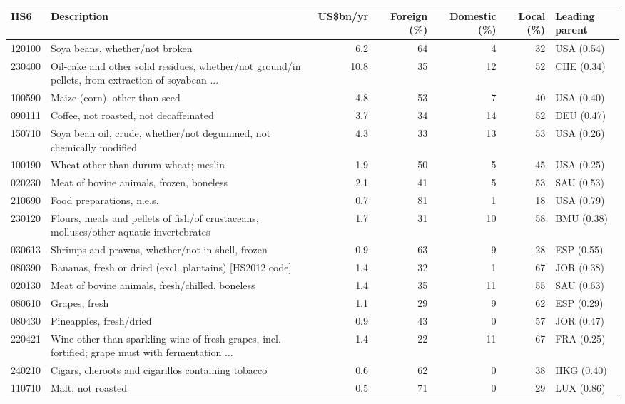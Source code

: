 \begin{tabular}{@{}l p{6.4cm} r r r r l@{}}
\toprule
HS6 & Description & US\$bn/yr & Foreign (\%) & Domestic (\%) & Local (\%) & Leading parent \\
\midrule
120100 & Soya beans, whether/\allowbreak{}not broken & 6.2 & 64 & 4 & 32 & USA (0.54) \\
230400 & Oil-cake and other solid residues, whether/\allowbreak{}not ground/\allowbreak{}in pellets, from extraction of soyabean ... & 10.8 & 35 & 12 & 52 & CHE (0.34) \\
100590 & Maize (corn), other than seed & 4.8 & 53 & 7 & 40 & USA (0.40) \\
090111 & Coffee, not roasted, not decaffeinated & 3.7 & 34 & 14 & 52 & DEU (0.47) \\
150710 & Soya bean oil, crude, whether/\allowbreak{}not degummed, not chemically modified & 4.3 & 33 & 13 & 53 & USA (0.26) \\
100190 & Wheat other than durum wheat; meslin & 1.9 & 50 & 5 & 45 & USA (0.25) \\
020230 & Meat of bovine animals, frozen, boneless & 2.1 & 41 & 5 & 53 & SAU (0.53) \\
210690 & Food preparations, n.e.s. & 0.7 & 81 & 1 & 18 & USA (0.79) \\
230120 & Flours, meals and pellets of fish/\allowbreak{}of crustaceans, molluscs/\allowbreak{}other aquatic invertebrates & 1.7 & 31 & 10 & 58 & BMU (0.38) \\
030613 & Shrimps and prawns, whether/\allowbreak{}not in shell, frozen & 0.9 & 63 & 9 & 28 & ESP (0.55) \\
080390 & Bananas, fresh or dried (excl. plantains) [HS2012 code] & 1.4 & 32 & 1 & 67 & JOR (0.38) \\
020130 & Meat of bovine animals, fresh/\allowbreak{}chilled, boneless & 1.4 & 35 & 11 & 55 & SAU (0.63) \\
080610 & Grapes, fresh & 1.1 & 29 & 9 & 62 & ESP (0.29) \\
080430 & Pineapples, fresh/\allowbreak{}dried & 0.9 & 43 & 0 & 57 & JOR (0.47) \\
220421 & Wine other than sparkling wine of fresh grapes, incl. fortified; grape must with fermentation ... & 1.4 & 22 & 11 & 67 & FRA (0.25) \\
240210 & Cigars, cheroots and cigarillos containing tobacco & 0.6 & 62 & 0 & 38 & HKG (0.40) \\
110710 & Malt, not roasted & 0.5 & 71 & 0 & 29 & LUX (0.86) \\

\end{tabular}
